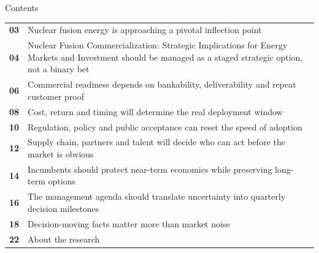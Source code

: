 \documentclass[10pt,a4paper]{article}
\begin{document}
\clearpage
{\sffamily\fontsize{26}{31}\selectfont\color{BONavy} Contents}\par\vspace{10pt}
\begin{tabularx}{\linewidth}{p{14mm}Y}
\textcolor{BOGreen}{\bfseries 03} & Nuclear fusion energy is approaching a pivotal inflection point \\[5pt]
\textcolor{BOGreen}{\bfseries 04} & Nuclear Fusion Commercialization: Strategic Implications for Energy Markets and Investment should be managed as a staged strategic option, not a binary bet \\[5pt]
\textcolor{BOGreen}{\bfseries 06} & Commercial readiness depends on bankability, deliverability and repeat customer proof \\[5pt]
\textcolor{BOGreen}{\bfseries 08} & Cost, return and timing will determine the real deployment window \\[5pt]
\textcolor{BOGreen}{\bfseries 10} & Regulation, policy and public acceptance can reset the speed of adoption \\[5pt]
\textcolor{BOGreen}{\bfseries 12} & Supply chain, partners and talent will decide who can act before the market is obvious \\[5pt]
\textcolor{BOGreen}{\bfseries 14} & Incumbents should protect near-term economics while preserving long-term options \\[5pt]
\textcolor{BOGreen}{\bfseries 16} & The management agenda should translate uncertainty into quarterly decision milestones \\[5pt]
\textcolor{BOGreen}{\bfseries 18} & Decision-moving facts matter more than market noise \\[5pt]
\textcolor{BOGreen}{\bfseries 22} & About the research \\[5pt]
\end{tabularx}
\clearpage
\end{document}
